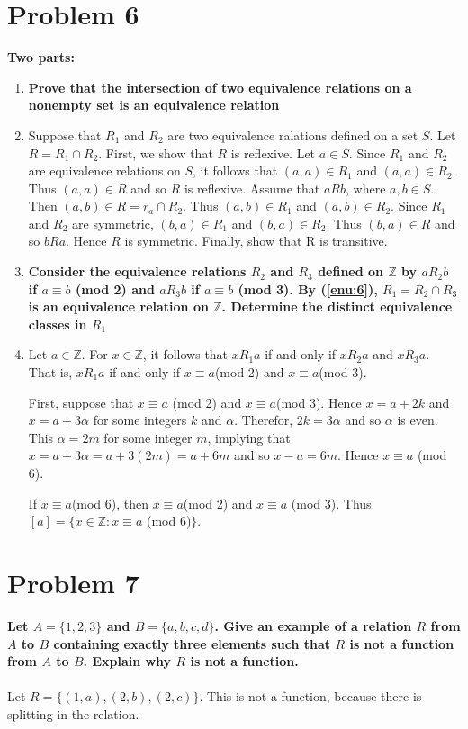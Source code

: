\documentclass[english,11pt,a4paper]{article}
\begin{document}
\section*{Problem 6}
\textbf{Two parts:}
\begin{enumerate}[a]
\item \label{enu:6}\textbf{Prove that the intersection of two equivalence relations on a nonempty set is an equivalence relation}
\item[]Suppose that $R_1$ and $R_2$ are two equivalence ralations defined on a set $S$.
Let $R= R_1 \cap R_2$.
First, we show that $R$ is reflexive.
Let $a \in S$. Since $R_1$ and $R_2$ are equivalence relations on $S$, it follows that $(a,a) \in R_1$ and $(a,a) \in R_2$. 
Thus $(a,a) \in R$ and so $R$ is reflexive. 
Assume that $aRb$, where $a, b \in S$.
Then $(a,b) \in R = r_a \cap R_2$. 
Thus $(a,b) \in R_1$ and $(a,b)\in R_2$. 
Since $R_1$ and $R_2$ are symmetric, $(b,a)\in R_1$ and $(b,a) \in R_2$. 
Thus $(b,a) \in R$ and so $bRa$.
Hence $R$ is symmetric.
Finally, show that R is transitive.

\item \textbf{Consider the equivalence relations $R_2$ and $R_3$ defined on $\mathbb{Z}$ by $aR_2b$ if $a \equiv b$ (mod 2) and $aR_3b$ if $a \equiv b$ (mod 3). By (\ref{enu:6}), $R_1=R_2 \cap R_3$ is an equivalence relation on $\mathbb{Z}$. Determine the distinct equivalence classes in $R_1$}
\item[] Let $a \in \mathbb{Z}$.
For $x \in \mathbb{Z}$, it follows that $xR_1a$ if and only if $xR_2a$ and $xR_3 a$. 
That is, $x R_1a$ if and only if $x \equiv a$(mod 2) and $x\equiv a$(mod 3).

First, suppose that $x \equiv a$ (mod 2) and $x\equiv a$(mod 3).
Hence $x=a+2k$ and $x=a+3\alpha$ for some integers $k$ and $\alpha$.
Therefor, $2k=3 \alpha$ and so $\alpha$ is even.
This $\alpha = 2m$ for some integer $m$, implying that $x=a+3\alpha=a+3(2m)=a+6m$ and so $x-a=6m$.
Hence $x \equiv a$ (mod 6).

If $x \equiv a$(mod 6), then $x \equiv a$(mod 2) and $x \equiv a$ (mod 3).
Thus $[a]=\{x \in \mathbb{Z}: x \equiv a$ (mod 6)$\}$.

\end{enumerate}


\section*{Problem 7}
\textbf{Let $A=\{1,2,3\}$ and $B=\{a, b, c, d\}$. Give an example of a relation $R$ from $A$ to $B$ containing exactly three elements such that $R$ is not a function from $A$ to $B$. Explain why $R$ is not a function.}
\\
\\
Let $R=\{(1,a),(2,b),(2,c)\}$.
This is not a function, because there is splitting in the relation.
\end{document}
